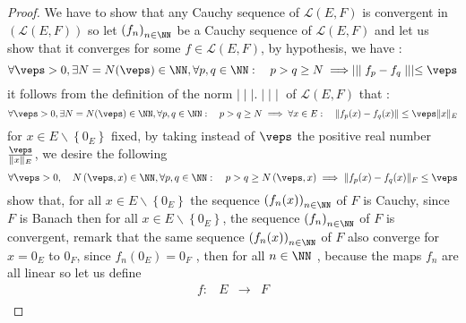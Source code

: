 \begin{proof}
	We have to show that any Cauchy sequence 
	of $\mathcal{L} \left( E,F \right)$  
	is convergent in $\left( \mathcal{L} (E,F)  \right)$  
	so let $\left( f_{n} \right)_{n \in \NN}$  be a Cauchy sequence
	of $\mathcal{L} (E,F) $ and let us show that it converges for some
	$f \in \mathcal{L} (E,F) $, by hypothesis, we have :
	\[
	\forall  \veps  >  0, \exists  N = N(\veps) \in 
	\NN,
	\forall p,q \in \NN : \quad  
	p > q \geq N \implies 
	\mid \mid \mid  f_{p} - f_{q} \mid \mid \mid  \leq \veps 
	\]
	it follows from the definition of the norm 
	$\mid \mid \mid  . \mid \mid \mid $  of 
	$\mathcal{L}(E,F)  $ that : 
	\[
	\forall \veps  > 0, \exists 
	N = N(\veps )  \in \NN, \forall p,q \in \NN : 
	\quad p > q \geq N \implies 
	\forall x \in E : 
	\quad \| f_{p}(x) - f_{q}(x)   \|  \leq \veps  
	\| x \| _{E}
	\]
	for $x \in E \backslash \left\{ 0_{E} \right\}$  fixed, 
	by taking instead of $\veps $  the positive
	real number 
	$\frac{\veps }{\| x \|_{E} }$, we desire the following 
	\[
	\forall \veps  > 0, \quad N \left( \veps ,x \right) 
	\in \NN, \forall p,q \in \NN : 
	\quad p > q \geq N \left( \veps , x \right) 
	\implies 
	\| f_{p}(x) - f_{q}(x)   \|  _{F} \leq 
	\veps 
	\]
	show that, for all $x \in E \backslash \left\{ 0_{E} \right\}$ 
	the sequence  $\left( f_{n} (x) \right)_{n \in \NN}$  of 
	$F$ is Cauchy, since $F$ is Banach then for all 
	$x \in E \backslash \left\{ 0_{E} \right\}$, the sequence 
	$\left( f_{n} \right)_{n \in \NN}$ of $F$ is convergent, 
	remark that the same sequence $\left( f_{n}(x)\right)_{n \in \NN}$ 
	of $F$ also converge for $x = 0_{E}$ to $0_{F}$, since
	$f_{n}(0_{E})=0_{F} $ , then for all $n \in \NN$ , because the 
	maps $f_{n}$ are all linear so let us define 
	\[
	\begin{array}{cccc}
	      f : &  E  & \longrightarrow & F \\
	

\end{array}\]
\end{proof}
